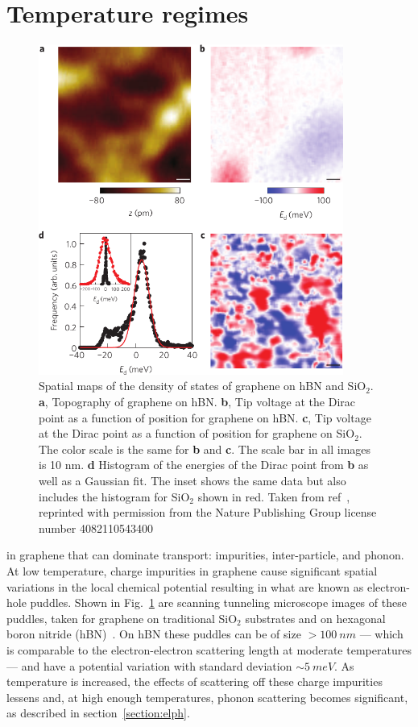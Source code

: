 \section{Temperature regimes}
\begin{figure}
\centering
\includegraphics[width=100mm]{figures/Dirac_fluid/charge_puddles.png}
\caption{Spatial maps of the density of states of graphene on hBN and SiO$_2$. \textbf{a}, Topography of graphene on hBN. \textbf{b}, Tip voltage at the Dirac point as a function of position for graphene on hBN. \textbf{c}, Tip voltage at the Dirac point as a function of position for graphene on SiO$_2$. The color scale is the same for \textbf{b} and \textbf{c}. The scale bar in all images is 10 nm. \textbf{d} Histogram of the energies of the Dirac point from \textbf{b} as well as a Gaussian fit. The inset shows the same data but also includes the histogram for SiO$_2$ shown in red. Taken from ref~\cite{xue_scanning_2011}, reprinted with permission from the Nature Publishing Group license number 4082110543400}
\label{fig:charge_puddles}
\end{figure}
 in graphene that can dominate transport: impurities, inter-particle, and phonon. At low temperature, charge impurities in graphene cause significant spatial variations in the local chemical potential resulting in what are known as electron-hole puddles. Shown in Fig.~\ref{fig:charge_puddles} are scanning tunneling microscope images of these puddles, taken for graphene on traditional SiO$_2$ substrates and on hexagonal boron nitride (hBN)~\cite{xue_scanning_2011}. On hBN these puddles can be of size $>100~nm$ --- which is comparable to the electron-electron scattering length at moderate temperatures --- and have a potential variation with standard deviation ${\sim 5}~meV$. As temperature is increased, the effects of scattering off these charge impurities lessens and, at high enough temperatures, phonon scattering becomes significant, as described in section~\ref{section:elph}. 

